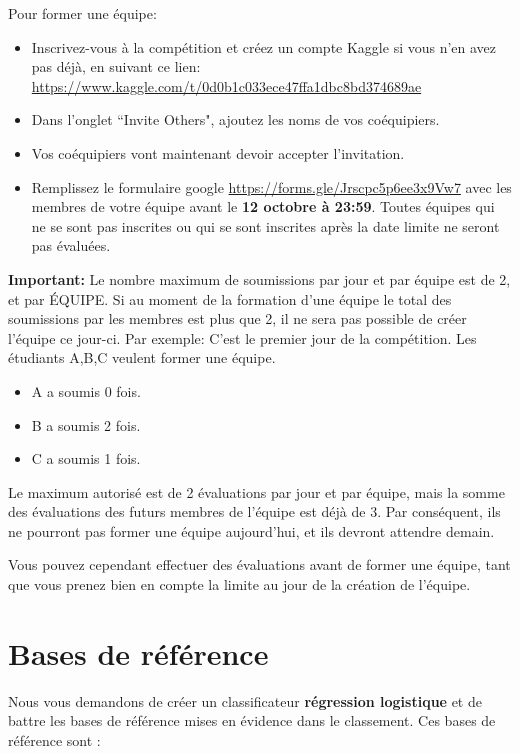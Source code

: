 \documentclass[12pt]{article}
\begin{document}
Pour former une équipe:
\begin{itemize}
\item Inscrivez-vous à la compétition et créez un compte Kaggle si vous n'en avez pas déjà, en suivant ce lien: \href{https://www.kaggle.com/t/0d0b1c033ece47ffa1dbc8bd374689ae}{https://www.kaggle.com/t/0d0b1c033ece47ffa1dbc8bd374689ae}
\item Dans l'onglet ``Invite Others", ajoutez les noms de vos coéquipiers.
\item Vos coéquipiers vont maintenant devoir accepter l'invitation.
\item Remplissez le formulaire google \url{https://forms.gle/Jrscpc5p6ee3x9Vw7} avec les membres de votre équipe avant le \textbf{12 octobre à 23:59}. Toutes équipes qui ne se sont pas inscrites ou qui se sont inscrites après la date limite ne seront pas évaluées.
\end{itemize}

\textbf{Important:} Le nombre maximum de soumissions par jour et par équipe est de 2, et par ÉQUIPE. Si au moment de la formation d'une équipe le total des soumissions par les membres est plus que 2, il ne sera pas possible de créer l'équipe ce jour-ci.
Par exemple: C'est le premier jour de la compétition. Les étudiants A,B,C veulent former une équipe.
\begin{itemize}
    \item A a soumis 0 fois.
    \item B a soumis 2 fois.
    \item C a soumis 1 fois.
\end{itemize}
Le maximum autorisé est de 2 évaluations par jour et par équipe, mais la somme des évaluations des futurs membres de l'équipe est déjà de 3. Par conséquent, ils ne pourront pas former une équipe aujourd'hui, et ils devront attendre demain.

Vous pouvez cependant effectuer des évaluations avant de former une équipe, tant que vous prenez bien en compte la limite au jour de la création de l'équipe.



\section{Bases de référence}
\label{sec:baselines}

Nous vous demandons de créer un classificateur \textbf{régression logistique} et de battre les bases de référence mises en évidence dans le classement. Ces bases de référence sont :
\end{document}

